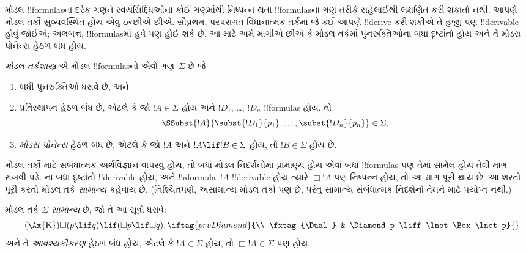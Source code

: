 \documentclass[../../../include/open-logic-section]{subfiles}
\begin{document}


મોડલ !!{formula}sના દરેક ગણને સ્વયંસિદ્ધિઓના કોઈ ગણમાંથી નિષ્પન્ન થતા
!!{formula}sના ગણ તરીકે સહેલાઈથી લક્ષણિત કરી શકાતો નથી. આપણે મોડલ તર્કો
સુવ્યવસ્થિત હોય એવું ઇચ્છીએ છીએ. સૌપ્રથમ, પરંપરાગત વિધાનાત્મક તર્કમાં
જે કંઈ આપણે !!{derive} કરી શકીએ તે હજી પણ !!{derivable} હોવું જોઈએ;
અલબત્ત, !!{formula}sમાં હવે  પણ હોઈ શકે છે. આ માટે
અમે માગીએ છીએ કે મોડલ તર્કમાં પુનરુક્તિઓના બધા દૃષ્ટાંતો હોય અને તે
મોડસ પોનેન્સ હેઠળ બંધ હોય.

\begin{defn}
  \emph{મોડલ તર્કશાસ્ત્ર} એ મોડલ !!{formula}sનો એવો ગણ~$\Sigma$ છે જે
  \begin{enumerate}
  \item બધી પુનરુક્તિઓ ધરાવે છે, અને
  \item પ્રતિસ્થાપન હેઠળ બંધ છે, એટલે કે જો $!A \in \Sigma$ હોય અને
    $!D_1$, \dots, $!D_n$ !!{formula}s હોય, તો
    \[
    \SSubst{!A}{\subst{!D_1}{p_1}, \dots, \subst{!D_n}{p_n}} \in \Sigma,
    \]
    \item \emph{મોડસ પોનેન્સ} હેઠળ બંધ છે, એટલે કે જો $!A$ અને $!A
      \lif !B \in \Sigma$ હોય, તો $!B \in \Sigma$ હોય છે.
  \end{enumerate}
\end{defn}

મોડલ તર્કો માટે સંબંધાત્મક અર્થવિજ્ઞાન વાપરવું હોય, તો બધાં મોડલ
નિદર્શનોમાં પ્રામાણ્ય હોય એવાં બધાં !!{formula}s પણ તેમાં સામેલ હોય તેવી
માગ રાખવી પડે. ના બધા દૃષ્ટાંતો
!!{derivable} હોય, અને !!a{formula}~$!A$ !!{derivable} હોય ત્યારે
$\Box !A$ પણ નિષ્પન્ન હોય, તો આ માગ પૂરી થાય છે. આ શરતો પૂરી કરતો
મોડલ તર્ક \emph{સામાન્ય} કહેવાય છે. (નિશ્ચિતપણે, અસામાન્ય મોડલ તર્કો પણ
છે, પરંતુ સામાન્ય સંબંધાત્મક નિદર્શનો તેમને માટે પર્યાપ્ત નથી.)

\begin{defn}
  મોડલ તર્ક $\Sigma$ \emph{સામાન્ય} છે, જો તે આ સૂત્રો ધરાવે:
  \begin{align*}
    \tag{\Ax{K}} & \Box(p \lif q) \lif (\Box p \lif \Box q),
    \iftag{prvDiamond}{\\
      \tag{\Dual} & \Diamond p \liff \lnot\Box\lnot p}{}
  \end{align*}
  અને તે \emph{આવશ્યકીકરણ} હેઠળ બંધ હોય, એટલે કે $!A \in
  \Sigma$ હોય, તો $\Box !A \in \Sigma$ પણ હોય.
\end{defn}
\end{document}
